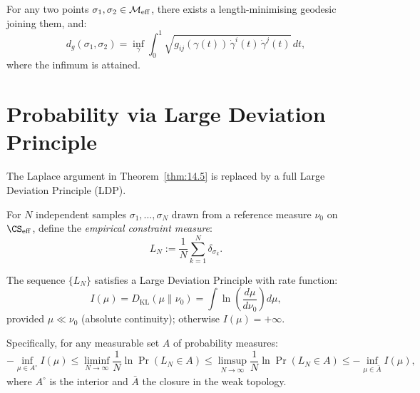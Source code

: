 \begin{corollary}\label{cor:15.3}
For any two points $\sigma_1, \sigma_2 \in \mathcal{M}_{\mathrm{eff}}$,
there exists a length-minimising geodesic joining them, and:
\begin{equation}\label{eq:geodesic-distance}
  d_g(\sigma_1, \sigma_2)
  = \inf_{\gamma} \int_0^1 \sqrt{g_{ij}(\gamma(t))\,
  \dot{\gamma}^i(t)\,\dot{\gamma}^j(t)}\,dt,
\end{equation}
where the infimum is attained.
\end{corollary}

\section{Probability via Large Deviation Principle}
\label{sec:ch15:ldp}

The Laplace argument in Theorem~\ref{thm:14.5} is replaced by a
full Large Deviation Principle (LDP).

\begin{definition}\label{def:15.4}
For $N$ independent samples $\sigma_1, \ldots, \sigma_N$ drawn
from a reference measure $\nu_0$ on $\CS_{\mathrm{eff}}$, define
the \emph{empirical constraint measure}:
\begin{equation}
  L_N := \frac{1}{N} \sum_{k=1}^N \delta_{\sigma_k}.
\end{equation}
\end{definition}

\begin{theorem}\label{thm:15.7}
The sequence $\{L_N\}$ satisfies a Large Deviation Principle with
rate function:
\begin{equation}\label{eq:rate-function}
  I(\mu) = D_{\mathrm{KL}}(\mu \| \nu_0)
  = \int \ln\!\left(\frac{d\mu}{d\nu_0}\right) d\mu,
\end{equation}
provided $\mu \ll \nu_0$ (absolute continuity); otherwise
$I(\mu) = +\infty$.

Specifically, for any measurable set $A$ of probability measures:
\begin{equation}\label{eq:ldp}
  -\inf_{\mu \in A^\circ} I(\mu) \leq
  \liminf_{N \to \infty} \frac{1}{N} \ln \Pr(L_N \in A)
  \leq \limsup_{N \to \infty} \frac{1}{N} \ln \Pr(L_N \in A)
  \leq -\inf_{\mu \in \bar{A}} I(\mu),
\end{equation}
where $A^\circ$ is the interior and $\bar{A}$ the closure in the
weak topology.
\end{theorem}

